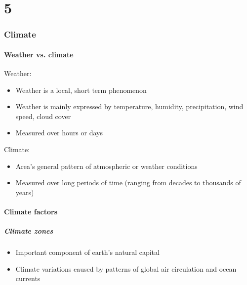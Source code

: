 \documentclass{article}
\begin{document}
\newpage
\part{5}
\section{Climate}
\subsection{Weather vs. climate}
Weather:
\begin{itemize}
    \item Weather is a local, short term phenomenon
    \item Weather is mainly expressed by temperature, humidity, precipitation, wind speed, cloud cover
    \item Measured over hours or days
\end{itemize}

Climate:
\begin{itemize}
    \item Area’s general pattern of atmospheric or weather conditions
    \item Measured over long periods of time (ranging from decades to thousands of years)
\end{itemize}

\subsection{Climate factors}
\subsubsection{Climate zones}
\begin{itemize}
    \item Important component of earth's natural capital
    \item Climate variations caused by patterns of global air circulation and ocean currents
\end{itemize}
\end{document}

